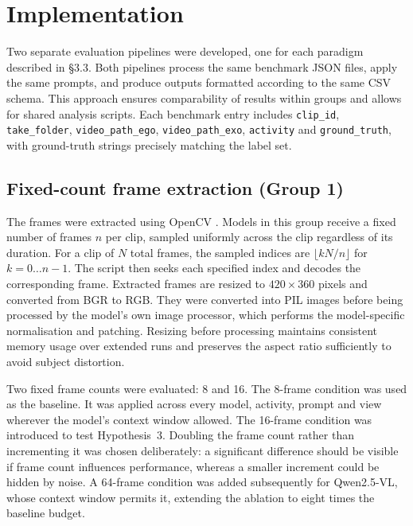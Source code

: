 \documentclass[logo,msc]{infthesis}
\begin{document}
\section{Implementation}

Two separate evaluation pipelines were developed, one for each paradigm
described in §3.3. Both pipelines process the same benchmark JSON files,
apply the same prompts, and produce outputs formatted according to the same
CSV schema. This approach ensures comparability of results within groups
and allows for shared analysis scripts. Each benchmark entry includes
\texttt{clip\_id}, \texttt{take\_folder}, \texttt{video\_path\_ego},
\texttt{video\_path\_exo}, \texttt{activity} and \texttt{ground\_truth},
with ground-truth strings precisely matching the label set.

\subsection{Fixed-count frame extraction (Group 1)}

The frames were extracted using OpenCV \citep{bradski2000}. Models in this
group receive a fixed number of frames $n$ per clip, sampled uniformly
across the clip regardless of its duration. For a clip of $N$ total frames,
the sampled indices are $\lfloor kN/n \rfloor$ for $k = 0 \ldots n-1$. The
script then seeks each specified index and decodes the corresponding frame.
Extracted frames are resized to $420 \times 360$ pixels and converted from
BGR to RGB. They were converted into PIL images before being processed by
the model's own image processor, which performs the model-specific
normalisation and patching. Resizing before processing maintains consistent
memory usage over extended runs and preserves the aspect ratio sufficiently
to avoid subject distortion.

Two fixed frame counts were evaluated: 8 and 16. The 8-frame condition was
used as the baseline. It was applied across every model, activity, prompt
and view wherever the model's context window allowed. The 16-frame
condition was introduced to test Hypothesis~3. Doubling the frame count
rather than incrementing it was chosen deliberately: a significant
difference should be visible if frame count influences performance, whereas
a smaller increment could be hidden by noise. A 64-frame condition was
added subsequently for Qwen2.5-VL, whose context window permits it,
extending the ablation to eight times the baseline budget.
\end{document}
